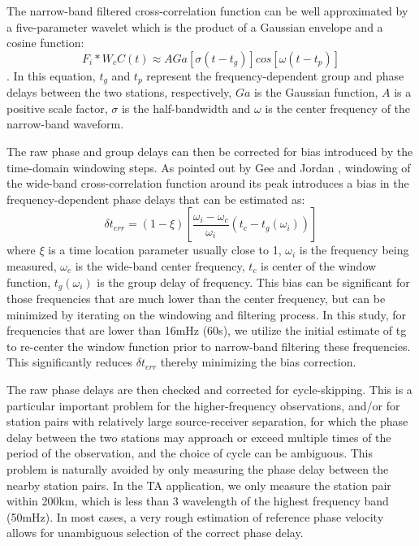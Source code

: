 \documentclass{gji}
\begin{document}
The narrow-band filtered cross-correlation function can be well approximated by a five-parameter wavelet which is the product of a Gaussian envelope and a cosine function:
\[
F_i \ast W_c C(t) \approx A Ga [\sigma(t-t_g)]cos[\omega(t-t_p)]
\]
\cite{Gee:1992ww}.  In this equation, $t_g$ and $t_p$ represent the frequency-dependent group and phase delays between the two stations, respectively, $Ga$ is the Gaussian function, $A$ is a positive scale factor, $\sigma$ is the half-bandwidth and $\omega$ is the center frequency of the narrow-band waveform.

The raw phase and group delays can then be corrected for bias introduced by the time-domain windowing steps.  As pointed out by Gee and Jordan , windowing of the wide-band cross-correlation function around its peak introduces a bias in the frequency-dependent phase delays that can be estimated as:
\[
\delta t_{err} = (1-\xi)\left[\frac{\omega_i - \omega_c}{\omega_i}\left(t_c - t_g(\omega_i)\right)\right]
\]
where $\xi$ is a time location parameter usually close to 1, $\omega_i$ is the frequency being measured, $\omega_c$ is the wide-band center frequency, $t_c$ is center of the window function, $t_g(\omega_i)$ is the group delay of frequency.  This bias can be significant for those frequencies that are much lower than the center frequency, but can be minimized by iterating on the windowing and filtering process.  In this study, for frequencies that are lower than 16mHz (60s), we utilize the initial estimate of tg to re-center the window function prior to narrow-band filtering these frequencies. This significantly reduces $\delta t_{err}$ thereby minimizing the bias correction.

The raw phase delays are then checked and corrected for cycle-skipping.  This is a particular important problem for the higher-frequency observations, and/or for station pairs with relatively large source-receiver separation, for which the phase delay between the two stations may approach or exceed multiple times of the period of the observation, and the choice of cycle can be ambiguous. This problem is naturally avoided by only measuring the phase delay between the nearby station pairs. In the TA application, we only measure the station pair within 200km, which is less than 3 wavelength of the highest frequency band (50mHz). In most cases, a very rough estimation of reference phase velocity allows for unambiguous selection of the correct phase delay. 
\end{document}
